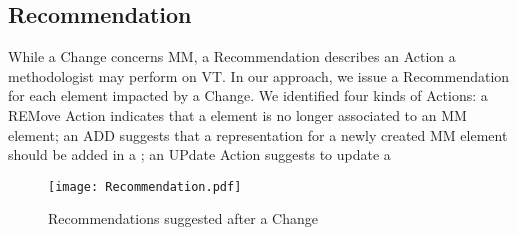 \subsection{Recommendation}
\label{sec:Suggestion:Recommendation}

While a \textsf{Change} concerns \textsf{MM}, a \textsf{Recommendation} describes
an \textsf{Action} a methodologist may perform on \textsf{VT}. In our approach, we
issue a \textsf{Recommendation} for each \viewtype element impacted by a 
\textsf{Change}. We identified four kinds of \textsf{Action}s: a \textsf{REM}ove
\textsf{Action} indicates that a \viewtype element is no longer associated to an
\textsf{MM} element; an \textsf{ADD} suggests that a representation for a newly 
created \textsf{MM} element should be added in a \viewtype; an \textsf{UP}date
\textsf{Action} suggests to update a 


\begin{figure}[t]
    \centering
    \texttt{[image: Recommendation.pdf]}
    \caption{\textsf{Recommendation}s suggested after a \textsf{Change}}
    \label{fig:Change}
\end{figure}